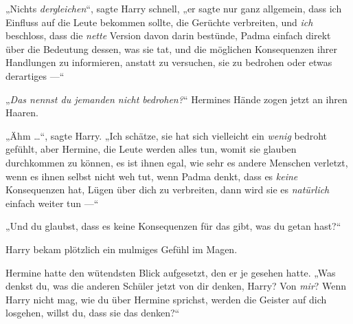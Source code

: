 „Nichts \emph{dergleichen}“, sagte Harry schnell, „er sagte nur ganz allgemein, dass ich Einfluss auf die Leute bekommen sollte, die Gerüchte verbreiten, und \emph{ich} beschloss, dass die \emph{nette} Version davon darin bestünde, Padma einfach direkt über die Bedeutung dessen, was sie tat, und die möglichen Konsequenzen ihrer Handlungen zu informieren, anstatt zu versuchen, sie zu bedrohen oder etwas derartiges —“

„\emph{Das nennst du jemanden nicht bedrohen?}“ Hermines Hände zogen jetzt an ihren Haaren.

„Ähm …“, sagte Harry.
„Ich schätze, sie hat sich vielleicht ein \emph{wenig} bedroht gefühlt, aber Hermine, die Leute werden alles tun, womit sie glauben durchkommen zu können, es ist ihnen egal, wie sehr es andere Menschen verletzt, wenn es ihnen selbst nicht weh tut, wenn Padma denkt, dass es \emph{keine} Konsequenzen hat, Lügen über dich zu verbreiten, dann wird sie es \emph{natürlich} einfach weiter tun —“

„Und du glaubst, dass es keine Konsequenzen für das gibt, was du getan hast?“

Harry bekam plötzlich ein mulmiges Gefühl im Magen.

Hermine hatte den wütendsten Blick aufgesetzt, den er je gesehen hatte.
„Was denkst du, was die anderen Schüler jetzt von dir denken, Harry? Von \emph{mir}? Wenn Harry nicht mag, wie du über Hermine sprichst, werden die Geister auf dich losgehen, willst du, dass sie das denken?“

